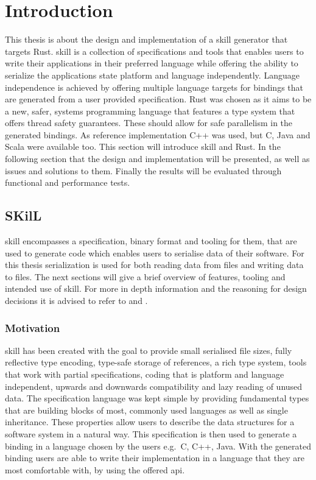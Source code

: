 \documentclass[thesis]{subfiles}
\begin{document}
\chapter{Introduction}\label{sec:intro}
This thesis is about the design and implementation of a \gls{skill} generator that targets Rust.
\gls{skill} is a collection of specifications and tools that enables users to write their applications in their preferred language while offering the ability to serialize the applications state platform and language independently\autocite{skill-tr}.
Language independence is achieved by offering multiple language targets for bindings that are generated from a user provided specification.
Rust was chosen as it aims to be a new, safer, systems programming language that features a type system that offers thread safety guarantees\autocite{rust-org}.
These should allow for safe parallelism in the generated bindings.
As reference implementation C++ was used, but C, Java and Scala were available too.
This section will introduce \gls{skill} and Rust.
In the following section that the design and implementation will be presented, as well as issues and solutions to them.
Finally the results will be evaluated through functional and performance tests.

\section{SKilL}\label{sec:skill}
  \gls{skill} encompasses a specification, binary format and tooling for them, that are used to generate code which enables users to serialise data of their software.
  For this thesis serialization is used for both reading data from files and writing data to files.
  The next sections will give a brief overview of features, tooling and intended use of \gls{skill}.
  For more in depth information and the reasoning for design decisions it is advised to refer to \autocite{skill-tr} and \autocite{skill-dis}.

  \subsection{Motivation}
    \gls{skill} has been created with the goal to provide small serialised file sizes, fully reflective type encoding, type-safe storage of references, a rich type system, tools that work with partial specifications,
    coding that is platform and language independent, upwards and downwards compatibility and lazy reading of unused data.
    The specification language was kept simple by providing fundamental types that are building blocks of most, commonly used languages as well as single inheritance.
    These properties allow users to describe the data structures for a software system in a natural way.
    This specification is then used to generate a binding in a language chosen by the users e.g.~C, C++, Java.
    With the generated binding users are able to write their implementation in a language that they are most comfortable with, by using the offered \gls{api}.
    \autocite{skill-tr}
\end{document}
